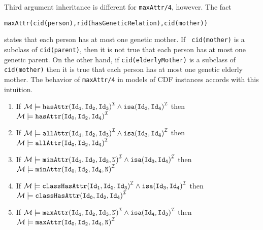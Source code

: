 Third argument inheritance is different for {\tt maxAttr/4}, however.
The fact

{\tt maxAttr(cid(person),rid(hasGeneticRelation),cid(mother))}

states that each person has at most one genetic mother.  If {\tt
cid(mother)} is a subclass of {\tt cid(parent)}, then it is not true
that each person has at most one genetic parent.  On the other hand,
if {\tt cid(elderlyMother)} is a subclass of {\tt cid(mother)} then it
is true that each person has at most one genetic elderly mother.  The
behavior of {\tt maxAttr/4} in models of CDF instances accords with
this intuition.

\begin{proposition} \rm
\label{prop:inh3} 
\end{proposition} 
\begin{enumerate}
\item If ${\cal M} \models {\tt hasAttr(Id_1,Id_2,Id_3)}^{{\cal I}} \wedge
					{\tt isa(Id_3,Id_4)}^{{\cal I}}$
					then ${\cal M} \models {\tt
					hasAttr(Id_0,Id_2,Id_4)}^{{\cal I}}
					$
%
\item If ${\cal M} \models {\tt allAttr(Id_1,Id_2,Id_3)}^{{\cal I}} \wedge
					{\tt isa(Id_3,Id_4)}^{{\cal I}}$ 
	then ${\cal M} \models {\tt allAttr(Id_0,Id_2,Id_4)}^{{\cal I}} $ 
%
\item If ${\cal M} \models {\tt minAttr(Id_1,Id_2,Id_3,N)}^{{\cal I}} \wedge
					{\tt isa(Id_3,Id_4)}^{{\cal I}}$ 
	then ${\cal M} \models {\tt minAttr(Id_0,Id_2,Id_4,N)}^{{\cal I}} $ 
%
\item If ${\cal M} \models {\tt classHasAttr(Id_1,Id_2,Id_3)}^{{\cal I}} \wedge
			  {\tt isa(Id_3,Id_4)}^{{\cal I}}$ 
	then ${\cal M} \models {\tt classHasAttr(Id_0,Id_2,Id_4)}^{{\cal I}} $ 
%
\item If ${\cal M} \models {\tt maxAttr(Id_1,Id_2,Id_3,N)}^{{\cal I}} \wedge
			  {\tt isa(Id_4,Id_3)}^{{\cal I}}$ 
	then ${\cal M} \models {\tt maxAttr(Id_0,Id_2,Id_4,N)}^{{\cal I}} $ 

\end{enumerate}


